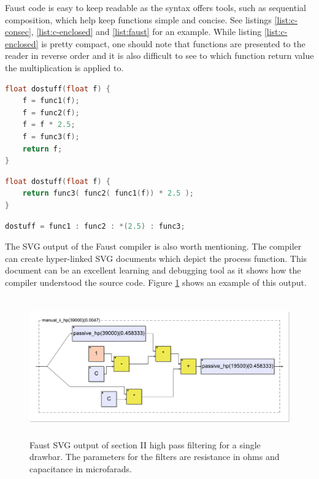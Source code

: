 \documentclass[11pt,a4paper]{article}
\begin{document}


Faust code is easy to keep readable as the syntax offers tools, such as sequential composition, which help keep functions simple and concise. See listings \ref{list:c-consec}, \ref{list:c-enclosed} and \ref{list:faust} for an example. While listing \ref{list:c-enclosed} is pretty compact, one should note that functions are presented to the reader in reverse order and it is also difficult to see to which function return value the multiplication is applied to.

\begin{lstlisting}[language=C,label=list:c-consec,caption=Consecutive calls]
float dostuff(float f) {
	f = func1(f);
	f = func2(f);
	f = f * 2.5;
	f = func3(f);
	return f;
}
\end{lstlisting}

\begin{lstlisting}[language=C,label=list:c-enclosed,caption=Enclosed statements]
float dostuff(float f) {
	return func3( func2( func1(f)) * 2.5 );
}
\end{lstlisting}

\begin{lstlisting}[language=C,label=list:faust,caption=Faust sequential composition]
dostuff = func1 : func2 : *(2.5) : func3;
\end{lstlisting}

The SVG output of the Faust compiler is also worth mentioning. The compiler can create hyper-linked SVG documents which depict the process function. This document can be an excellent learning and debugging tool as it shows how the compiler understood the source code. Figure \ref{fig:manual_ii_hp} shows an example of this output.

\begin{figure}[tbp]
\centering
\includegraphics[height=60mm,angle=270]{manual_ii_hp.pdf}
\caption{Faust SVG output of section II high pass filtering for a single drawbar. The parameters for the filters are resistance in ohms and capacitance in microfarads.}
\label{fig:manual_ii_hp}
\end{figure}
\end{document}
